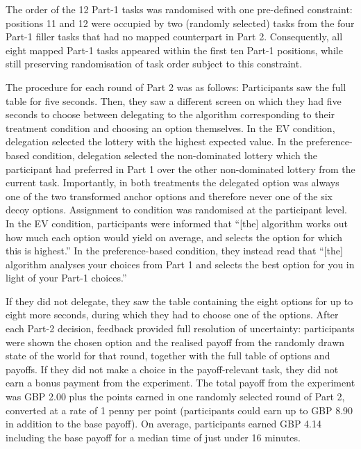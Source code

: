\documentclass[a4paper, 12pt, fleqn]{article}
\theoremstyle{hypstyle}
\begin{document}
The order of the 12 Part-1 tasks was randomised with one pre-defined constraint: positions 11 and 12 were occupied by two (randomly selected) tasks from the four Part-1 filler tasks that had no mapped counterpart in Part 2. Consequently, all eight mapped Part-1 tasks appeared within the first ten Part-1 positions, while still preserving randomisation of task order subject to this constraint.

The procedure for each round of Part 2 was as follows: Participants saw the full table for five seconds. Then, they saw a different screen on which they had five seconds to choose between delegating to the algorithm corresponding to their treatment condition and choosing an option themselves.
In the EV condition, delegation selected the lottery with the highest expected value. In the preference-based condition, delegation selected the non-dominated lottery which the participant had preferred in Part 1 over the other non-dominated lottery from the current task. Importantly, in both treatments the delegated option was always one of the two transformed anchor options and therefore never one of the six decoy options. Assignment to condition was randomised at the participant level. In the EV condition, participants were informed that ``[the] algorithm works out how much each option would yield on average, and selects the option for which this is highest.'' In the preference-based condition, they instead read that ``[the] algorithm analyses your choices from Part 1 and selects the best option for you in light of your Part-1 choices.''

If they did not delegate, they saw the table containing the eight options for up to eight more seconds, during which they had to choose one of the options. After each Part-2 decision, feedback provided full resolution of uncertainty: participants were shown the chosen option and the realised payoff from the randomly drawn state of the world for that round, together with the full table of options and payoffs. If they did not make a choice in the payoff-relevant task, they did not earn a bonus payment from the experiment. The total payoff from the experiment was GBP 2.00 plus the points earned in one randomly selected round of Part 2, converted at a rate of 1 penny per point (participants could earn up to GBP 8.90 in addition to the base payoff). On average, participants earned GBP 4.14 including the base payoff for a median time of just under 16 minutes.
\end{document}
